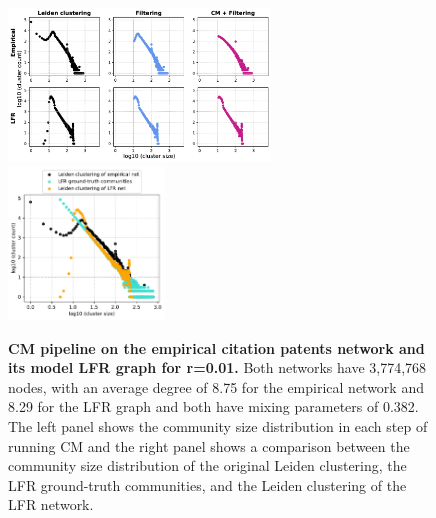 \documentclass[11pt]{article}   	%
\begin{document}
\begin{figure}[h!]
\centering
\includegraphics[width=0.62\textwidth]{figs/cit_patents_cm_steps_lfr01.pdf}
\includegraphics[width=0.37\textwidth]{figs/cit_patents_01_cm_size.pdf}
\caption[CM pipeline on the empirical Citation Patents Network and its model LFR graph for r=0.01]{\textbf{CM pipeline on the empirical citation patents network and its model LFR graph for r=0.01.} Both networks have 3,774,768 nodes, with an average degree of 8.75 for the empirical network and 8.29 for the LFR graph and both have mixing parameters of 0.382. The left panel shows the community size distribution in each step of running CM and the right panel shows a comparison between the community size distribution of the original Leiden clustering, the LFR ground-truth communities, and the Leiden clustering of the LFR network.}
\label{fig:patents-cm-lfr-01}
\end{figure}
\end{document}

